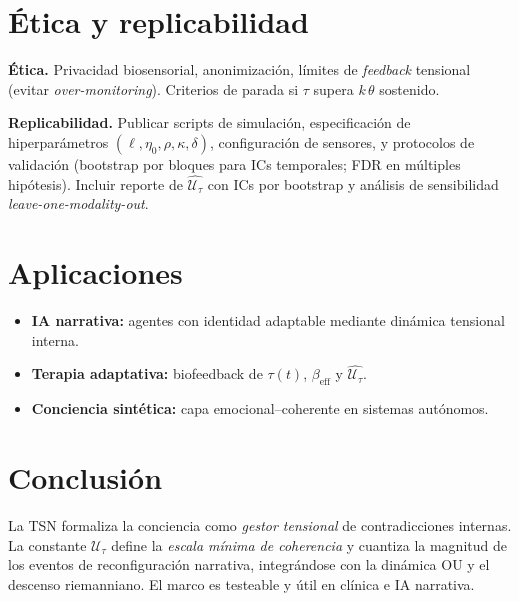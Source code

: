 \documentclass[10pt,a4paper,twocolumn]{article}
\theoremstyle{definition}
\theoremstyle{plain}
\begin{document}
\section{Ética y replicabilidad}
\textbf{Ética.} Privacidad biosensorial, anonimización, límites de \emph{feedback} tensional (evitar \emph{over-monitoring}). Criterios de parada si \(\tau\) supera \(k\,\theta\) sostenido.

\textbf{Replicabilidad.} Publicar scripts de simulación, especificación de hiperparámetros \((\ell,\eta_0,\rho,\kappa,\delta)\), configuración de sensores, y protocolos de validación (bootstrap por bloques para ICs temporales; FDR en múltiples hipótesis). Incluir reporte de \(\widehat{\mathcal{U}_\tau}\) con ICs por bootstrap y análisis de sensibilidad \emph{leave-one-modality-out}.

\section{Aplicaciones}
\begin{itemize}[leftmargin=1em]
  \item \textbf{IA narrativa:} agentes con identidad adaptable mediante dinámica tensional interna.
  \item \textbf{Terapia adaptativa:} biofeedback de \(\tau(t)\), \(\beta_{\mathrm{eff}}\) y \(\widehat{\mathcal{U}_\tau}\).
  \item \textbf{Conciencia sintética:} capa emocional–coherente en sistemas autónomos.
\end{itemize}

\section{Conclusión}
La TSN formaliza la conciencia como \emph{gestor tensional} de contradicciones internas. La constante \(\mathcal{U}_\tau\) define la \emph{escala mínima de coherencia} y cuantiza la magnitud de los eventos de reconfiguración narrativa, integrándose con la dinámica OU y el descenso riemanniano. El marco es testeable y útil en clínica e IA narrativa.
\end{document}
